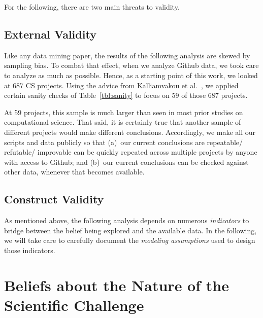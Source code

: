 \documentclass[sigconf,review,anonymous]{acmart}
\begin{document}
For the following, there are two main threats to validity.

\subsection{External Validity}
Like any data mining paper,
the results of the following analysis are skewed by sampling bias.
To combat that effect, when we analyze Github data, we took care to analyze as much as possible.
Hence,
as a starting point of this work, we looked at 687 CS projects. 
Using the advice from Kalliamvakou et al.~\cite{Kalliamvakou:2014}, we applied certain sanity checks of Table~\ref{tbl:sanity}  to focus on 59 of those 687 projects.

At 59 projects, this sample is much larger than seen in
most prior studies on computational
science. That said, it is certainly true that another sample of different projects would make different conclusions.
Accordingly, we make all our scripts and data publicly so that
(a)~our current conclusions
are repeatable/ refutable/ improvable can be quickly repeated across multiple projects by anyone with access to Github; and (b)~our current conclusions can be checked against other data, whenever that becomes available.



\subsection{Construct Validity}
As mentioned above, the following analysis depends on numerous {\em indicators} to bridge between the belief being explored and the available data. 
In the following,  we will take care to carefully document
the {\em modeling assumptions} used to design those indicators.

\section{Beliefs about the Nature of the Scientific Challenge}

\end{document}
